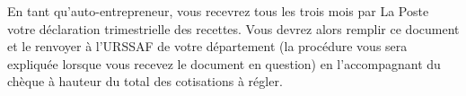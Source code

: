 ﻿En tant qu’auto-entrepreneur, vous recevrez tous les trois mois par La Poste votre déclaration trimestrielle des recettes. Vous devrez alors remplir ce document et le renvoyer à l’URSSAF de votre département (la procédure vous sera expliquée lorsque vous recevez le document en question) en l’accompagnant du chèque à hauteur du total des cotisations à régler.